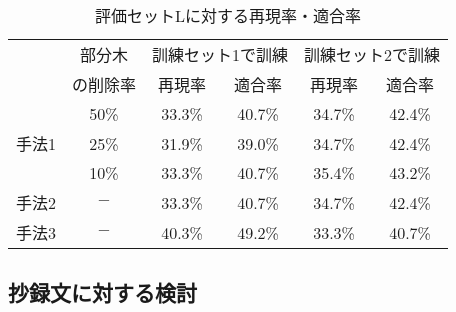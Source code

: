{\footnotesize
\begin{table}[hbtp]
 \begin{center}
  \tabcolsep=5mm
  \begin{tabular}{|c|c||c|c|c|c|} \hline
         & 部分木   & \multicolumn{2}{|c|}{訓練セット1で訓練} & \multicolumn{2}{c|}{訓練セット2で訓練} \\ \cline{3-6}
         & の削除率 & 再現率 & 適合率 & 再現率 & 適合率 \\ \hline \hline
         & 50\%     & 33.3\% & 40.7\% & 34.7\% & 42.4\% \\ \cline{2-6}
   手法1 & 25\%     & 31.9\% & 39.0\% & 34.7\% & 42.4\% \\ \cline{2-6}
         & 10\%     & 33.3\% & 40.7\% & 35.4\% & 43.2\% \\ \hline
   手法2 &  $-$     & 33.3\% & 40.7\% & 34.7\% & 42.4\% \\ \hline
   手法3 &  $-$     & 40.3\% & 49.2\% & 33.3\% & 40.7\% \\ \hline
  \end{tabular}
 \end{center}
  \caption{評価セットLに対する再現率・適合率}
  \label{tab:saigen_tekigou2}
\end{table}
}

\subsection{抄録文に対する検討}

